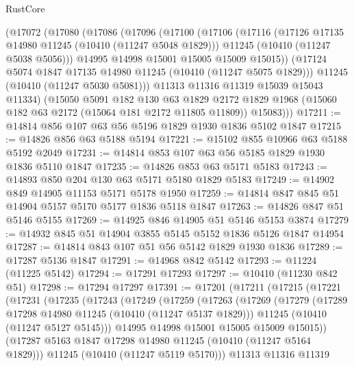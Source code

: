 \begin{lexlean}{RustCore}
\begin{coremodule}
    (@17072
      (@17080
        (@17086
          (@17096
            (@17100
              (@17106
                (@17116
                  (@17126 @17135 @14980 @11245 (@10410 (@11247 @5048 @1829)))
                  @11245
                  (@10410 (@11247 @5038 @5056)))
                @14995
                @14998
                @15001
                @15005
                @15009
                @15015))
            (@17124 @5074 @1847 @17135 @14980 @11245 (@10410 (@11247 @5075 @1829)))
            @11245
            (@10410 (@11247 @5030 @5081)))
          @11313
          @11316
          @11319
          @15039
          @15043
          @11334)
        (@15050
          @5091
          @182
          @130
          @63
          @1829
          @2172
          @1829
          @1968
          (@15060 @182 @63 @2172 (@15064 @181 @2172 @11805 @11809))
          @15083)))
@17211 := @14814 @856 @107 @63 @56 @5196 @1829 @1930 @1836 @5102 @1847
@17215 := @14826 @856 @63 @5188 @5194
@17221 := @15102 @855 @10966 @63 @5188 @5192 @2049
@17231 := @14814 @853 @107 @63 @56 @5185 @1829 @1930 @1836 @5110 @1847
@17235 := @14826 @853 @63 @5171 @5183
@17243 := @14893 @850 @204 @130 @63 @5171 @5180 @1829 @5183
@17249 := @14902 @849 @14905 @11153 @5171 @5178 @1950
@17259 := @14814 @847 @845 @51 @14904 @5157 @5170 @5177 @1836 @5118 @1847
@17263 := @14826 @847 @51 @5146 @5155
@17269 := @14925 @846 @14905 @51 @5146 @5153 @3874
@17279 := @14932 @845 @51 @14904 @3855 @5145 @5152 @1836 @5126 @1847 @14954
@17287 := @14814 @843 @107 @51 @56 @5142 @1829 @1930 @1836
@17289 := @17287 @5136 @1847
@17291 := @14968 @842 @5142
@17293 := @11224 (@11225 @5142)
@17294 := @17291 @17293
@17297 := @10410 (@11230 @842 @51)
@17298 := @17294 @17297
@17391 := @17201
    (@17211
      (@17215
        (@17221
          (@17231
            (@17235
              (@17243
                (@17249
                  (@17259
                    (@17263
                      (@17269
                        (@17279
                          (@17289 @17298 @14980 @11245 (@10410 (@11247 @5137 @1829)))
                          @11245
                          (@10410 (@11247 @5127 @5145)))
                        @14995
                        @14998
                        @15001
                        @15005
                        @15009
                        @15015))
                    (@17287 @5163 @1847 @17298 @14980 @11245 (@10410 (@11247 @5164 @1829)))
                    @11245
                    (@10410 (@11247 @5119 @5170)))
                  @11313
                  @11316
                  @11319

\end{coremodule}
\end{lexlean}

